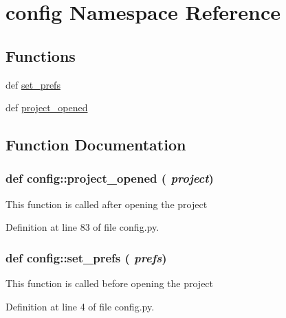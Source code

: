 \hypertarget{namespaceconfig}{
\section{config Namespace Reference}
\label{namespaceconfig}
}
\subsection*{Functions}
\begin{DoxyCompactItemize}
\item 
def \hyperlink{namespaceconfig_a077cf782860460ed4fddfd77eb8e94e6}{set\_\-prefs}
\item 
def \hyperlink{namespaceconfig_ad174f8d0b20540bf911131e432e9e1f2}{project\_\-opened}
\end{DoxyCompactItemize}


\subsection{Function Documentation}
\hypertarget{namespaceconfig_ad174f8d0b20540bf911131e432e9e1f2}{
\subsubsection[{project\_\-opened}]{\setlength{\rightskip}{0pt plus 5cm}def config::project\_\-opened ( {\em project})}}
\label{namespaceconfig_ad174f8d0b20540bf911131e432e9e1f2}
\begin{DoxyVerb}This function is called after opening the project\end{DoxyVerb}
 

Definition at line 83 of file config.py.

\hypertarget{namespaceconfig_a077cf782860460ed4fddfd77eb8e94e6}{
\subsubsection[{set\_\-prefs}]{\setlength{\rightskip}{0pt plus 5cm}def config::set\_\-prefs ( {\em prefs})}}
\label{namespaceconfig_a077cf782860460ed4fddfd77eb8e94e6}
\begin{DoxyVerb}This function is called before opening the project\end{DoxyVerb}
 

Definition at line 4 of file config.py.

